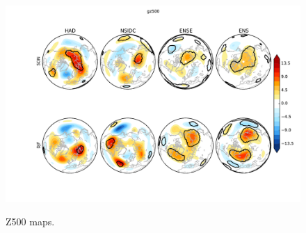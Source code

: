 \documentclass[twocol]{ametsoc}
\begin{document}
\begin{figure}[t]
  \noindent\includegraphics[width=35pc,angle=0]{gz500diffsigcont_enssubplot_forpap3_seas_nh2.pdf}\\ %
  \caption{Z500 maps.
}\label{fig:fig3c}
\end{figure}
\end{document}
